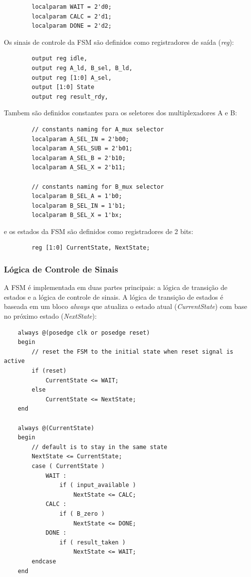 \documentclass[a4paper,11pt]{article} %
\begin{document}
\begin{verbatim}
        localparam WAIT = 2'd0;
        localparam CALC = 2'd1;
        localparam DONE = 2'd2;
\end{verbatim}

Os sinais de controle da FSM são definidos como registradores de saída (\textit{reg}):
\begin{verbatim}
        output reg idle,
        output reg A_ld, B_sel, B_ld,
        output reg [1:0] A_sel,
        output [1:0] State
        output reg result_rdy,
\end{verbatim}

Tambem são definidos constantes para os seletores dos multiplexadores A e B:
\begin{verbatim}
        // constants naming for A_mux selector
        localparam A_SEL_IN = 2'b00;
        localparam A_SEL_SUB = 2'b01;
        localparam A_SEL_B = 2'b10;
        localparam A_SEL_X = 2'b11;

        // constants naming for B_mux selector
        localparam B_SEL_A = 1'b0;
        localparam B_SEL_IN = 1'b1;
        localparam B_SEL_X = 1'bx;
\end{verbatim}

e os estados da FSM são definidos como registradores de 2 bits:
\begin{verbatim}
        reg [1:0] CurrentState, NextState;
\end{verbatim}

\subsubsection{Lógica de Controle de Sinais}
A FSM é implementada em duas partes principais: a lógica de transição de estados e a lógica de controle de sinais. A lógica de transição de estados é baseada em um bloco \textit{always} que
atualiza o estado atual (\textit{CurrentState}) com base no próximo estado (\textit{NextState}):
\begin{verbatim}
    always @(posedge clk or posedge reset)  
    begin 
        // reset the FSM to the initial state when reset signal is active
        if (reset) 
            CurrentState <= WAIT;
        else 
            CurrentState <= NextState; 
    end 

    always @(CurrentState)
    begin
        // default is to stay in the same state
        NextState <= CurrentState;
        case ( CurrentState )
            WAIT :
                if ( input_available )
                    NextState <= CALC;
            CALC :
                if ( B_zero )
                    NextState <= DONE;
            DONE :
                if ( result_taken )
                    NextState <= WAIT;
        endcase
    end
\end{verbatim}
\end{document}
